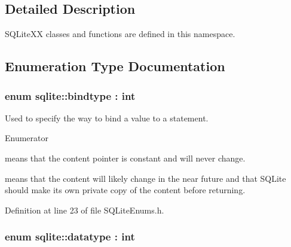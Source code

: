 \subsection{Detailed Description}
S\-Q\-Lite\-X\-X classes and functions are defined in this namespace. 

\subsection{Enumeration Type Documentation}
\hypertarget{a00038_ae6a0fc429d821cca9a1b01d36cb0991d}{
\subsubsection[{bindtype}]{\setlength{\rightskip}{0pt plus 5cm}enum {\bf sqlite\-::bindtype} \-: int\hspace{0.3cm}{\ttfamily [strong]}}}\label{a00038_ae6a0fc429d821cca9a1b01d36cb0991d}


Used to specify the way to bind a value to a statement. 

\begin{Desc}
\item[Enumerator]\par
\begin{description}
\item[{\em 
\hypertarget{a00038_ae6a0fc429d821cca9a1b01d36cb0991da29adf7ed88000fbb825808cb1d3667fa}{statically}\label{a00038_ae6a0fc429d821cca9a1b01d36cb0991da29adf7ed88000fbb825808cb1d3667fa}
}]means that the content pointer is constant and will never change. \item[{\em 
\hypertarget{a00038_ae6a0fc429d821cca9a1b01d36cb0991dad51ecd4c7c8454ddc870989523c01d4b}{transiently}\label{a00038_ae6a0fc429d821cca9a1b01d36cb0991dad51ecd4c7c8454ddc870989523c01d4b}
}]means that the content will likely change in the near future and that S\-Q\-Lite should make its own private copy of the content before returning. \end{description}
\end{Desc}


Definition at line 23 of file S\-Q\-Lite\-Enums.\-h.

\hypertarget{a00038_a7467e5cdd32bbf7fce35aced88682dc0}{
\subsubsection[{datatype}]{\setlength{\rightskip}{0pt plus 5cm}enum {\bf sqlite\-::datatype} \-: int\hspace{0.3cm}{\ttfamily [strong]}}}\label{a00038_a7467e5cdd32bbf7fce35aced88682dc0}


